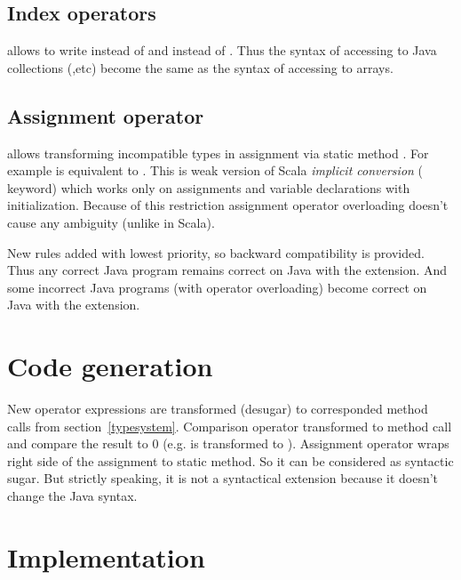 \documentclass{aircc}
\begin{document}
\subsection{Index operators}
allows to write  instead of 
and  instead of .
Thus the syntax of accessing to Java collections (,etc) 
become the same as the syntax of accessing to arrays.

\subsection{Assignment operator}
\begin{mathpar}
\end{mathpar}
allows transforming incompatible types in assignment via static method .
For example  is equivalent to .
This is weak version of Scala \textit{implicit conversion}\cite{itc} ( keyword) which works only on assignments and variable declarations with initialization.
Because of this restriction assignment operator overloading doesn't cause any ambiguity (unlike in Scala).

New rules added with lowest priority, so backward compatibility is provided.
Thus any correct Java program remains correct on Java with the extension.
And some incorrect Java programs (with operator overloading) become correct on Java with the extension.

\section{Code generation}

New operator expressions are transformed (desugar) to corresponded method calls from section~\ref{typesystem}.
Comparison operator transformed to  method call and compare the result to 0 (e.g.  is transformed to ). Assignment operator wraps right side of the assignment to static  method.
So it can be considered as syntactic sugar.
But strictly speaking, it is not a syntactical extension because it doesn't change the Java syntax.

\section{Implementation}
\end{document}
